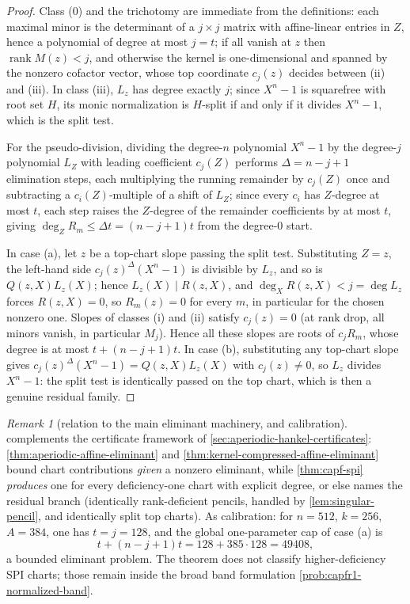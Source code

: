 \documentclass[11pt]{article}
\theoremstyle{definition}
\theoremstyle{remark}
\newtheorem{remark}[remark]{Remark}
\begin{document}
\begin{proof}
Class \textup{(0)} and the trichotomy are immediate from the definitions: each maximal minor is the determinant of a $j\times j$ matrix with affine-linear entries in $Z$, hence a polynomial of degree at most $j=t$; if all vanish at $z$ then $\operatorname{rank}M(z)<j$, and otherwise the kernel is one-dimensional and spanned by the nonzero cofactor vector, whose top coordinate $c_j(z)$ decides between \textup{(ii)} and \textup{(iii)}.  In class \textup{(iii)}, $L_z$ has degree exactly $j$; since $X^n-1$ is squarefree with root set $H$, its monic normalization is $H$-split if and only if it divides $X^n-1$, which is the split test.

For the pseudo-division, dividing the degree-$n$ polynomial $X^n-1$ by the degree-$j$ polynomial $L_Z$ with leading coefficient $c_j(Z)$ performs $\Delta=n-j+1$ elimination steps, each multiplying the running remainder by $c_j(Z)$ once and subtracting a $c_i(Z)$-multiple of a shift of $L_Z$; since every $c_i$ has $Z$-degree at most $t$, each step raises the $Z$-degree of the remainder coefficients by at most $t$, giving $\deg_ZR_m\le\Delta t=(n-j+1)t$ from the degree-$0$ start.

In case \textup{(a)}, let $z$ be a top-chart slope passing the split test.  Substituting $Z=z$, the left-hand side $c_j(z)^\Delta(X^n-1)$ is divisible by $L_z$, and so is $Q(z,X)L_z(X)$; hence $L_z(X)\mid R(z,X)$, and $\deg_XR(z,X)<j=\deg L_z$ forces $R(z,X)=0$, so $R_m(z)=0$ for every $m$, in particular for the chosen nonzero one.  Slopes of classes \textup{(i)} and \textup{(ii)} satisfy $c_j(z)=0$ \textup{(at rank drop, all minors vanish, in particular $M_j$)}.  Hence all these slopes are roots of $c_jR_m$, whose degree is at most $t+(n-j+1)t$.  In case \textup{(b)}, substituting any top-chart slope gives $c_j(z)^\Delta(X^n-1)=Q(z,X)L_z(X)$ with $c_j(z)\ne0$, so $L_z$ divides $X^n-1$: the split test is identically passed on the top chart, which is then a genuine residual family.
\end{proof}

\begin{remark}[relation to the main eliminant machinery, and calibration]\label{rem:capf-spi-calibration}
 complements the certificate framework of \cref{sec:aperiodic-hankel-certificates}: \cref{thm:aperiodic-affine-eliminant} and \cref{thm:kernel-compressed-affine-eliminant} bound chart contributions \emph{given} a nonzero eliminant, while \cref{thm:capf-spi} \emph{produces} one for every deficiency-one chart with explicit degree, or else names the residual branch \textup{(identically rank-deficient pencils, handled by \cref{lem:singular-pencil}, and identically split top charts)}.  As calibration: for $n=512$, $k=256$, $A=384$, one has $t=j=128$, and the global one-parameter cap of case \textup{(a)} is
\[
        t+(n-j+1)t=128+385\cdot128=49408,
\]
a bounded eliminant problem.  The theorem does not classify higher-deficiency SPI charts; those remain inside the broad band formulation \cref{prob:capfr1-normalized-band}.
\end{remark}
\end{document}
